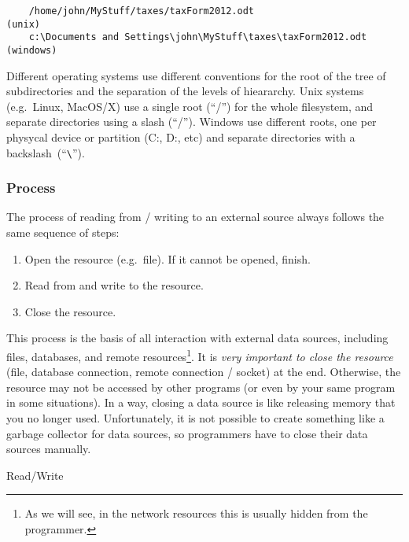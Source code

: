 \begin{verbatim}
    /home/john/MyStuff/taxes/taxForm2012.odt                     (unix)
    c:\Documents and Settings\john\MyStuff\taxes\taxForm2012.odt (windows)
\end{verbatim}

Different operating systems use different conventions for the root of
the tree of subdirectories and the separation of the levels of
hieararchy. Unix systems (e.g.~Linux, MacOS/X) use a single root
(``/'') for the whole filesystem, and separate directories using a
slash (``/''). Windows use different roots, one per physycal device or
partition (C:, D:, etc) and separate directories with a 
backslash~(``\verb+\+''). 

\subsubsection*{Process}
\label{sec:process}

The process of reading from / writing to an external source always
follows the same sequence of steps:

\begin{enumerate}
\item Open the resource (e.g.~file). If it cannot be opened, finish.
\item Read from and write to the resource.
\item Close the resource. 
\end{enumerate}

This process is the basis of all interaction with external data
sources, including files, databases, and remote resources\footnote{As
  we will see, in the network resources this is usually hidden from
  the programmer.}.
It is \emph{very important to close the resource} (file, database
connection, remote connection / socket) at the
end. Otherwise, the resource may not be accessed by other programs (or
even by your same program in some situations). In a way, closing a
data source is like releasing memory that you no longer
used. Unfortunately, it is not possible to create something like a
garbage collector for data sources, so programmers have to close their
data sources manually.



Read/Write

%
%

